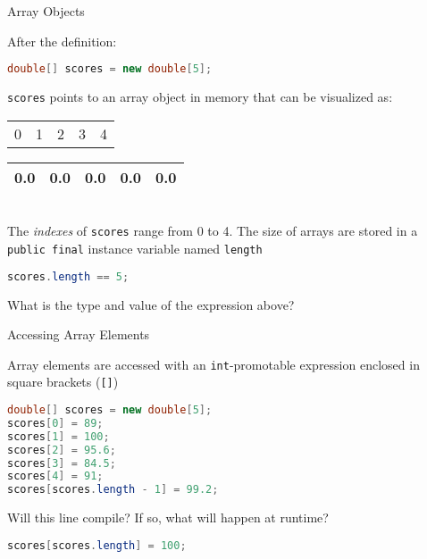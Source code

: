 \documentclass{beamer}
\begin{document}
\begin{frame}[fragile]{Array Objects}


After the definition:
\begin{lstlisting}[language=Java]
double[] scores = new double[5];
\end{lstlisting}
{\tt scores} points to an array object in memory that can be visualized as:\\
\vspace{.1in}
\begin{tabular}{p{.5in}p{.5in}p{.5in}p{.5in}p{.5in}}
0 & 1 & 2 & 3 & 4 \\
\end{tabular}
\begin{tabular}{|p{.5in}|p{.5in}|p{.5in}|p{.5in}|p{.5in}|}\hline
0.0 & 0.0 & 0.0 & 0.0 & 0.0 \\
\hline
\end{tabular}\\
\vspace{.1in}
The {\it indexes} of {\tt scores} range from 0 to 4.  The size of arrays are stored in a {\tt public final} instance variable named {\tt length}

\begin{lstlisting}[language=Java]
scores.length == 5;
\end{lstlisting}
What is the type and value of the expression above?

\end{frame}

\begin{frame}[fragile]{Accessing Array Elements}


Array elements are accessed with an {\tt int}-promotable expression enclosed in square brackets ({\tt []})
\begin{lstlisting}[language=Java]
double[] scores = new double[5];
scores[0] = 89;
scores[1] = 100;
scores[2] = 95.6;
scores[3] = 84.5;
scores[4] = 91;
scores[scores.length - 1] = 99.2;
\end{lstlisting}


\vspace{.1in}
Will this line compile?  If so, what will happen at runtime?
\begin{lstlisting}[language=Java]
scores[scores.length] = 100;
\end{lstlisting}


\end{frame}
\end{document}
